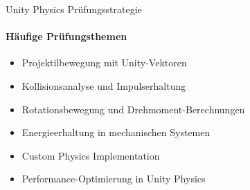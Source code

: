 \begin{KR}{Unity Physics Prüfungsstrategie}
    \paragraph{Häufige Prüfungsthemen}
    \begin{itemize}
        \item Projektilbewegung mit Unity-Vektoren
        \item Kollisionsanalyse und Impulserhaltung
        \item Rotationsbewegung und Drehmoment-Berechnungen
        \item Energieerhaltung in mechanischen Systemen
        \item Custom Physics Implementation
        \item Performance-Optimierung in Unity Physics
    \end{itemize}
\end{KR}

